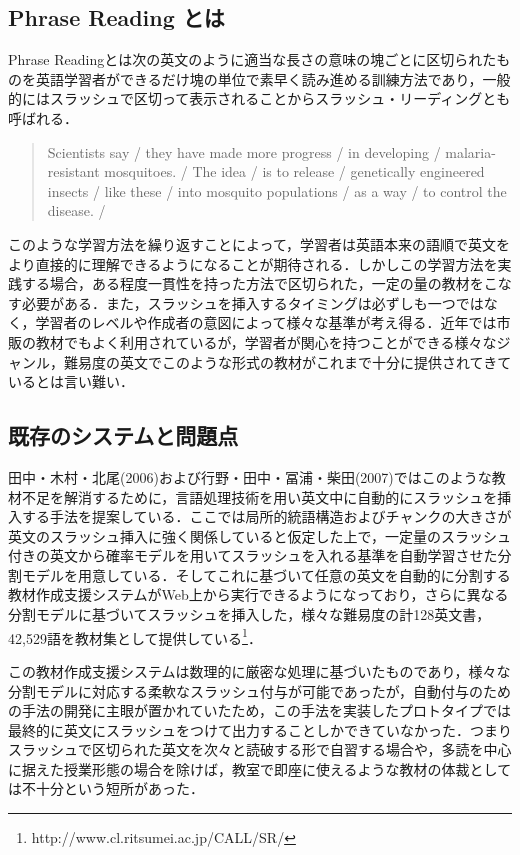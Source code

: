 \documentclass[japanese]{jnlp_1.4}
\begin{document}
\subsection{Phrase Reading とは}

Phrase Readingとは次の英文のように適当な長さの意味の塊ごとに区切られたものを英語学習者ができるだけ塊の単位で素早く読み進める訓練方法であり，一般的にはスラッシュで区切って表示されることからスラッシュ・リーディングとも呼ばれる．

\begin{quote}
Scientists say / they have made more progress / in developing / malaria-resistant mosquitoes. / The idea / is to release / genetically engineered insects / like these / into mosquito populations / as a way / to control the disease. / 
\end{quote}

このような学習方法を繰り返すことによって，学習者は英語本来の語順で英文をより直接的に理解できるようになることが期待される．しかしこの学習方法を実践する場合，ある程度一貫性を持った方法で区切られた，一定の量の教材をこなす必要がある．また，スラッシュを挿入するタイミングは必ずしも一つではなく，学習者のレベルや作成者の意図によって様々な基準が考え得る．近年では市販の教材でもよく利用されているが，学習者が関心を持つことができる様々なジャンル，難易度の英文でこのような形式の教材がこれまで十分に提供されてきているとは言い難い．


\subsection{既存のシステムと問題点}

田中・木村・北尾(2006)および行野・田中・冨浦・柴田(2007)ではこのような教材不足を解消するために，言語処理技術を用い英文中に自動的にスラッシュを挿入する手法を提案している．ここでは局所的統語構造およびチャンクの大きさが英文のスラッシュ挿入に強く関係していると仮定した上で，一定量のスラッシュ付きの英文から確率モデルを用いてスラッシュを入れる基準を自動学習させた分割モデルを用意している．そしてこれに基づいて任意の英文を自動的に分割する教材作成支援システムがWeb上から実行できるようになっており，さらに異なる分割モデルに基づいてスラッシュを挿入した，様々な難易度の計128英文書，42,529語を教材集として提供している\footnote{http://www.cl.ritsumei.ac.jp/CALL/SR/}．

この教材作成支援システムは数理的に厳密な処理に基づいたものであり，様々な分割モデルに対応する柔軟なスラッシュ付与が可能であったが，自動付与のための手法の開発に主眼が置かれていたため，この手法を実装したプロトタイプでは最終的に英文にスラッシュをつけて出力することしかできていなかった．つまりスラッシュで区切られた英文を次々と読破する形で自習する場合や，多読を中心に据えた授業形態の場合を除けば，教室で即座に使えるような教材の体裁としては不十分という短所があった．
\end{document}
